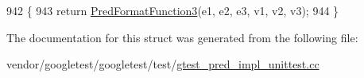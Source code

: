 \begin{DoxyCode}
942                                                           \{
943     \textcolor{keywordflow}{return} \hyperlink{gtest__pred__impl__unittest_8cc_abddc62e1faf4d19992a0acb69577e0f3}{PredFormatFunction3}(e1, e2, e3, v1, v2, v3);
944   \}
\end{DoxyCode}


The documentation for this struct was generated from the following file\+:\begin{DoxyCompactItemize}
\item 
vendor/googletest/googletest/test/\hyperlink{gtest__pred__impl__unittest_8cc}{gtest\+\_\+pred\+\_\+impl\+\_\+unittest.\+cc}\end{DoxyCompactItemize}

